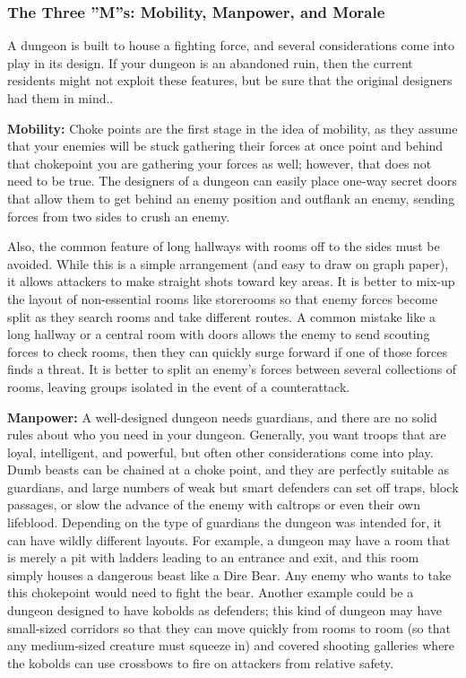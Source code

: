\subsubsection{The Three ''M''s: Mobility, Manpower, and Morale}

A dungeon is built to house a fighting force, and several considerations come into play in its design. If your dungeon is an abandoned ruin, then the current residents might not exploit these features, but be sure that the original designers had them in mind..

\textbf{Mobility:} Choke points are the first stage in the idea of mobility, as they assume that your enemies will be stuck gathering their forces at once point and behind that chokepoint you are gathering your forces as well; however, that does not need to be true. The designers of a dungeon can easily place one-way secret doors that allow them to get behind an enemy position and outflank an enemy, sending forces from two sides to crush an enemy.

Also, the common feature of long hallways with rooms off to the sides must be avoided. While this is a simple arrangement (and easy to draw on graph paper), it allows attackers to make straight shots toward key areas. It is better to mix-up the layout of non-essential rooms like storerooms so that enemy forces become split as they search rooms and take different routes. A common mistake like a long hallway or a central room with doors allows the enemy to send scouting forces to check rooms, then they can quickly surge forward if one of those forces finds a threat. It is better to split an enemy's forces between several collections of rooms, leaving groups isolated in the event of a counterattack.

\textbf{Manpower:} A well-designed dungeon needs guardians, and there are no solid rules about who you need in your dungeon. Generally, you want troops that are loyal, intelligent, and powerful, but often other considerations come into play. Dumb beasts can be chained at a choke point, and they are perfectly suitable as guardians, and large numbers of weak but smart defenders can set off traps, block passages, or slow the advance of the enemy with caltrops or even their own lifeblood. Depending on the type of guardians the dungeon was intended for, it can have wildly different layouts. For example, a dungeon may have a room that is merely a pit with ladders leading to an entrance and exit, and this room simply houses a dangerous beast like a Dire Bear. Any enemy who wants to take this chokepoint would need to fight the bear. Another example could be a dungeon designed to have kobolds as defenders; this kind of dungeon may have small-sized corridors so that they can move quickly from rooms to room (so that any medium-sized creature must squeeze in) and covered shooting galleries where the kobolds can use crossbows to fire on attackers from relative safety.

